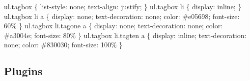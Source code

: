 \documentclass[b5paper,11pt,twoside]{scrbook} %
\begin{document}
\begin{enumerate}
    ul.tagbox \{ list-style: none; text-align: justify; \}\newline
    ul.tagbox li \{ display: inline; \}\newline
    ul.tagbox li a \{ display: none; text-decoration: none; color: \#e05698; font-size: 60\% \} \newline
    ul.tagbox li.tagone a \{  display: none; text-decoration: none; color: \#a3004e; font-size: 80\% \} \newline
    ul.tagbox li.tagten a \{  display: inline; text-decoration: none; color: \#830030; font-size: 100\% \} \newline
\end{enumerate}

\subsection{Plugins} 
\end{document}
